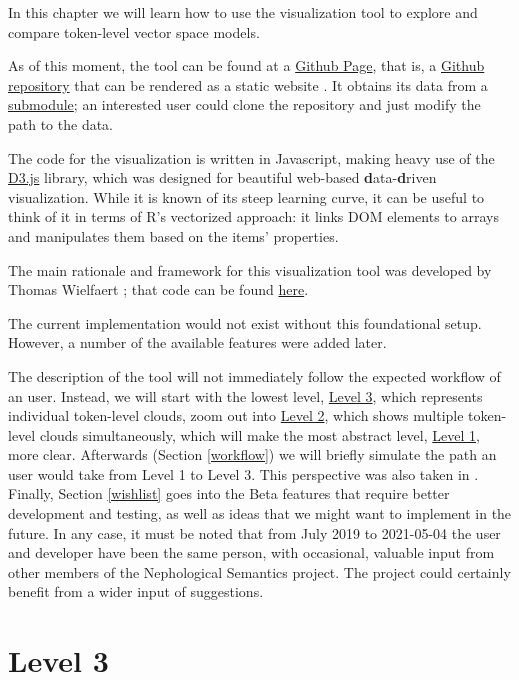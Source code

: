 \documentclass[
]{book}
\begin{document}
In this chapter we will learn how to use the visualization tool to explore
and compare token-level vector space models.

As of this moment, the tool can be found at a
\href{https://qlvl.github.io/NephoVis}{Github Page}, that is,
a \href{https://github.com/qlvl/NephoVis}{Github repository} that can be rendered
as a static website \autocite{montes.qlvl_2021}.
It obtains its data from a \href{https://github.com/qlvl/tokenclouds}{submodule};
an interested user could clone the repository and just modify the path to the data.

The code for the visualization is written in Javascript, making heavy use of the
\href{https://d3.js}{D3.js} library, which was designed for beautiful web-based
\textbf{d}ata-\textbf{d}riven visualization. While it is known of its steep learning curve,
it can be useful to think of it in terms of R's vectorized approach: it links
DOM elements to arrays and manipulates them based on the items' properties.

The main rationale and framework for this visualization tool was developed by
Thomas Wielfaert \autocite{wielfaert.etal_2019}; that code can be found
\href{https://github.com/tokenclouds/tokenclouds.github.io/LeTok/}{here}.

The current implementation would not exist without this foundational setup. However,
a number of the available features were added later.

The description of the tool will not immediately follow the expected workflow of an user.
Instead, we will start with the lowest level, \protect\hyperlink{level_3}{Level 3},
which represents individual token-level clouds,
zoom out into \protect\hyperlink{level_2}{Level 2}, which shows multiple token-level clouds simultaneously,
which will make the most abstract level, \protect\hyperlink{level_1}{Level 1}, more clear.
Afterwards (Section \ref{workflow}) we will briefly simulate the path an user would take from Level 1 to Level 3.
This perspective was also taken in \textcite{montes.heylen_Submitted}.
Finally, Section \ref{wishlist} goes into the Beta features
that require better development and testing, as well as ideas that we might want to
implement in the future. In any case, it must be noted that from July 2019 to
2021-05-04 the user and developer have been the same person, with occasional,
valuable input from other members of the Nephological Semantics project. The
project could certainly benefit from a wider input of suggestions.

\hypertarget{level_3}{%
\section{Level 3}\label{level_3}}
\end{document}
